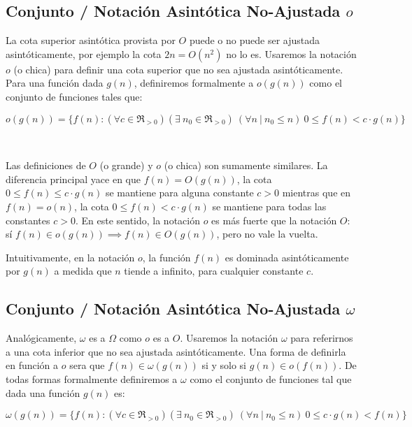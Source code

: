 \subsection{Conjunto / Notaci\'on Asint\'otica No-Ajustada $o$}

La cota superior asint\'otica provista por $O$ puede o no puede ser ajustada asint\'oticamente, por ejemplo la cota $2n = O(n^2)$ no lo es. Usaremos la notaci\'on $o$ (o chica) para definir una cota superior que no sea ajustada asint\'oticamente. Para una funci\'on dada $g(n)$, definiremos formalmente a $o(g(n))$ como el conjunto de funciones tales que:

\begin{equation*}
 o(g(n)) = \{ f(n) : (\forall c \in \Re_{>0})(\exists\ n_0 \in \Re_{>0}) \ (\forall n\ |\ n_0 \leq n)\ 0 \leq f(n) < c \cdot g(n) \}
\end{equation*}

~

Las definiciones de $O$ (o grande) y $o$ (o chica) son sumamente similares. La diferencia principal yace en que $f(n) = O(g(n))$, la cota $0 \leq f(n) \leq c \cdot g(n)$ se mantiene para alguna constante $c > 0$ mientras que en $f(n) = o(n)$, la cota $0 \leq f(n) < c \cdot g(n)$ se mantiene para todas las constantes $c > 0$.
En este sentido, la notaci\'on $o$ es m\'as fuerte que la notaci\'on $O$: s\'i $f(n) \in o(g(n)) \implies f(n) \in O(g(n))$, pero no vale la vuelta.

Intuitivamente, en la notaci\'on $o$, la funci\'on $f(n)$ es dominada asint\'oticamente por $g(n)$ a medida que $n$ tiende a infinito, para cualquier constante $c$.

\subsection{Conjunto / Notaci\'on Asint\'otica No-Ajustada $\omega$}

Anal\'ogicamente, $\omega$ es a $\Omega$ como $o$ es a $O$. Usaremos la notaci\'on $\omega$ para referirnos a una cota inferior que no sea ajustada asint\'oticamente. Una forma de definirla en funci\'on a $o$ sera que $f(n) \in \omega(g(n))$ si y solo si $g(n) \in o(f(n))$. De todas formas formalmente definiremos a $\omega$ como el conjunto de funciones tal que dada una funci\'on $g(n)$ es:

\begin{equation*}
 \omega(g(n)) = \{ f(n) : (\forall c \in \Re_{>0})(\exists\ n_0 \in \Re_{>0}) \ (\forall n\ |\ n_0 \leq n)\ 0 \leq c \cdot g(n) < f(n) \}
\end{equation*}

